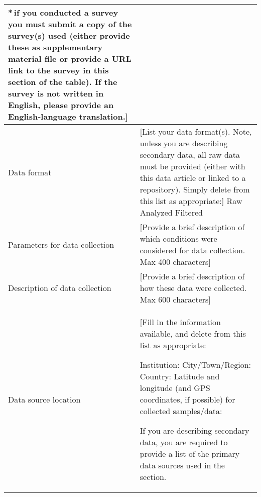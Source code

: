 \documentclass[times,final]{elsarticle.cls}
\begin{document}
{\begin{longtable}{|p{33mm}|p{94mm}|}
                         {\fontsize{7pt}{8pt}\selectfont
                         *\,if you conducted a survey you must submit a copy of the 
                         survey(s) used (either provide these as supplementary material 
                         file or provide a URL link to the survey 
                         in this section of the table). 
                         If the survey is not written in English, 
                         please provide an English-language translation.}]\\
\hline                         
Data format            & [List your data format(s). Note, unless you are describing secondary data, 
                         all raw data must be provided (either with this data article or linked to a repository). 
                         Simply delete from this list as appropriate:]\newline
                         Raw\newline
                         Analyzed\newline
                         Filtered\\
\hline                         
Parameters for         
data\newline 
collection             & [Provide a brief description of which conditions were considered 
                         for data collection. Max 400 characters]\\  

\hline
Description of          
data\newline 
collection             & [Provide a brief description of how these data were collected. 
                         Max 600 characters]\\
\hline                         
Data source location   & [Fill in the information available, and delete from this list as appropriate:\newline

                         Institution:\newline
                         City/Town/Region:\newline
                         Country:\newline
                         Latitude and longitude (and GPS coordinates, if possible) for collected samples/data:\newline


                         If you are describing secondary data, you are required to provide a list of 
                         the primary data sources used in the section.\newline


\end{longtable}}
\end{document}
